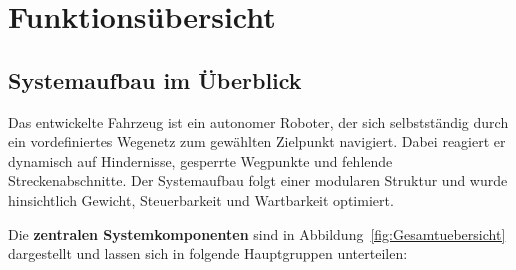 \documentclass[main.tex]{subfiles} %
\begin{document}

\section{Funktionsübersicht}

\subsection{Systemaufbau im Überblick}

Das entwickelte Fahrzeug ist ein autonomer Roboter, der sich selbstständig durch ein 
vordefiniertes Wegenetz zum gewählten Zielpunkt navigiert. Dabei reagiert er 
dynamisch auf Hindernisse, gesperrte Wegpunkte und fehlende Streckenabschnitte. Der 
Systemaufbau folgt einer modularen Struktur und wurde hinsichtlich Gewicht, 
Steuerbarkeit und Wartbarkeit optimiert.

Die \textbf{zentralen Systemkomponenten} sind in Abbildung~\ref{fig:Gesamtuebersicht} 
dargestellt und lassen sich in folgende Hauptgruppen unterteilen:
\end{document}
